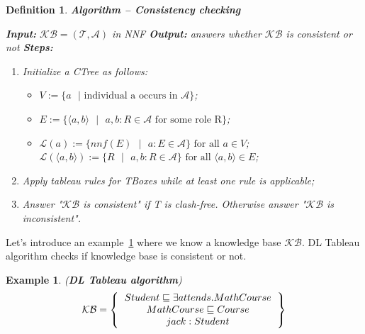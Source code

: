 \documentclass[12pt,a4paper]{article}
\newtheorem{definition}{Definition}[subsection]
\newtheorem{example}{Example}[subsection]
\begin{document}
\begin{definition}{\textbf{Algorithm -- Consistency checking}}
	\label{def:consistency}

\textbf{Input:} $\mathcal{KB} = (\mathcal{T}, \mathcal{A})$ in NNF \newline
\indent \textbf{Output:} answers whether $\mathcal{KB}$ is consistent or not \newline
\indent \textbf{Steps:}
\begin{enumerate}
	\item Initialize a CTree as follows:
		\begin{itemize}
			\item $V := \{ a \text{ } | \text{ individual a occurs in } \mathcal{A} \}$;
			\item $E := \{ \langle a,b \rangle \text{ } | \text{ } a,b : R \in \mathcal{A} \text{ for some role R} \}$;
			\item $\mathcal{L}(a) := \{ nnf(E) \text{ } | \text{ } a:E \in \mathcal{A}\} \text{ for all } a \in V$; \newline
			$\mathcal{L}(\langle a,b \rangle) := \{ R \text{ } | \text{ } a,b:R \in \mathcal{A}\} \text{ for all } \langle a,b \rangle \in E$;
		\end{itemize}
	\item Apply tableau rules for TBoxes while at least one rule is applicable;
	\item Answer "$\mathcal{KB}$ is consistent" if T is clash-free. Otherwise answer "$\mathcal{KB}$ is inconsistent".
\end{enumerate}

\end{definition}

Let's introduce an example~\ref{example:dlTableau} where we know a knowledge base $\mathcal{KB}$. DL Tableau algorithm checks if knowledge base is consistent or not.

\begin{example}{(\textbf{DL Tableau algorithm})}
	\label{example:dlTableau}
	\[ 
	\mathcal{KB} = \left\{
	\begin{tabular}{c c}
	$Student \sqsubseteq \exists attends.MathCourse$ \\
	$MathCourse \sqsubseteq Course$ \\
	$jack : Student$ \\
	\end{tabular}
	\right \}
	\] \\
\end{example}
\end{document}
